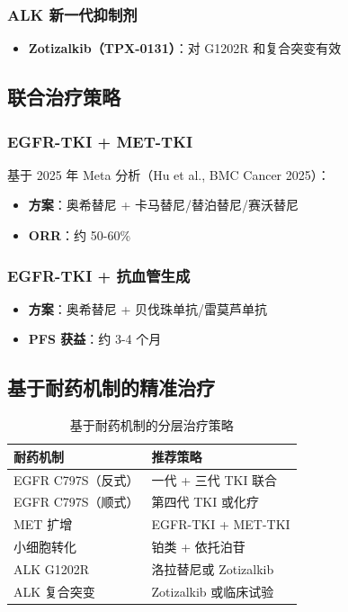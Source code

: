 \documentclass[12pt,a4paper]{article}
\begin{document}
\subsubsection{ALK 新一代抑制剂}
\begin{itemize}
    \item \textbf{Zotizalkib（TPX-0131）}：对 G1202R 和复合突变有效
\end{itemize}

\subsection{联合治疗策略}

\subsubsection{EGFR-TKI + MET-TKI}

基于 2025 年 Meta 分析（Hu et al., BMC Cancer 2025）：
\begin{itemize}
    \item \textbf{方案}：奥希替尼 + 卡马替尼/替泊替尼/赛沃替尼
    \item \textbf{ORR}：约 50-60\%
\end{itemize}

\subsubsection{EGFR-TKI + 抗血管生成}
\begin{itemize}
    \item \textbf{方案}：奥希替尼 + 贝伐珠单抗/雷莫芦单抗
    \item \textbf{PFS 获益}：约 3-4 个月
\end{itemize}

\subsection{基于耐药机制的精准治疗}

\begin{table}[H]
\centering
\caption{基于耐药机制的分层治疗策略}
\label{tab:precision-treatment}
\begin{tabular}{p{4cm}p{6cm}}
\toprule
\textbf{耐药机制} & \textbf{推荐策略} \\
\midrule
EGFR C797S（反式） & 一代 + 三代 TKI 联合 \\
EGFR C797S（顺式） & 第四代 TKI 或化疗 \\
MET 扩增 & EGFR-TKI + MET-TKI \\
小细胞转化 & 铂类 + 依托泊苷 \\
ALK G1202R & 洛拉替尼或 Zotizalkib \\
ALK 复合突变 & Zotizalkib 或临床试验 \\
\bottomrule
\end{tabular}
\end{table}
\end{document}
